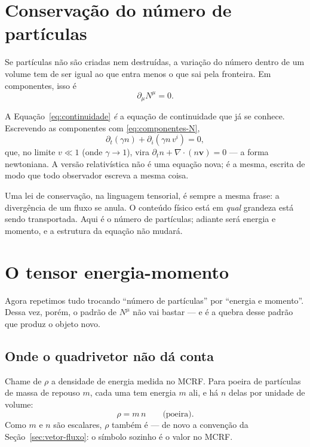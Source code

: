 \documentclass[12pt,a4paper,oneside]{book}
\theoremstyle{rgplain}
\theoremstyle{rgremark}
\begin{document}
\section{Conservação do número de partículas}
\label{sec:conservacao-numero}

Se partículas não são criadas nem destruídas, a variação do número dentro de
um volume tem de ser igual ao que entra menos o que sai pela fronteira. Em
componentes, isso é
\begin{equation}
  \partial_\mu N^\mu=0 .
  \label{eq:continuidade}
\end{equation}

A Equação~\eqref{eq:continuidade} \emph{é} a equação de continuidade que já se
conhece. Escrevendo as componentes com \eqref{eq:componentes-N},
\[
  \partial_t(\gamma n)+\partial_i(\gamma n\,v^i)=0 ,
\]
que, no limite $v\ll1$ (onde $\gamma\to1$), vira
$\partial_t n+\nabla\!\cdot(n\bm v)=0$ --- a forma newtoniana. A versão
relativística não é uma equação nova; é a mesma, escrita de modo que todo
observador escreva a mesma coisa.

\begin{central}
Uma lei de conservação, na linguagem tensorial, é sempre a mesma frase: a
divergência de um fluxo se anula. O conteúdo físico está em \emph{qual}
grandeza está sendo transportada. Aqui é o número de partículas; adiante será
energia e momento, e a estrutura da equação não mudará.
\end{central}

\section{O tensor energia-momento}
\label{sec:tensor-em}

Agora repetimos tudo trocando ``número de partículas'' por ``energia e
momento''. Dessa vez, porém, o padrão de $N^\mu$ não vai bastar --- e é a quebra desse padrão que produz o objeto novo.

\subsection*{Onde o quadrivetor não dá conta}

Chame de $\rho$ a densidade de energia medida no MCRF. Para poeira de
partículas de massa de repouso $m$, cada uma tem energia $m$ ali, e há $n$
delas por unidade de volume:
\begin{equation}
  \rho=m\,n \qquad\text{(poeira)} .
  \label{eq:rho-poeira}
\end{equation}
Como $m$ e $n$ são escalares, $\rho$ também é --- de novo a convenção da
Seção~\ref{sec:vetor-fluxo}: o símbolo sozinho é o valor no MCRF.
\end{document}
